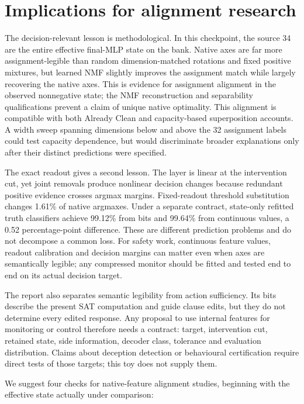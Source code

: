 \documentclass[
  british,
  11pt,
  a4paper,
]{article}
\begin{document}
\section{Implications for alignment
research}\label{implications-for-alignment-research}

The decision-relevant lesson is methodological. In this checkpoint, the
source 34 are the entire effective final-MLP state on the bank. Native
axes are far more assignment-legible than random dimension-matched
rotations and fixed positive mixtures, but learned NMF slightly improves
the assignment match while largely recovering the native axes. This is
evidence for assignment alignment in the observed nonnegative state; the
NMF reconstruction and separability qualifications prevent a claim of
unique native optimality. This alignment is compatible with both Already
Clean and capacity-based superposition accounts. A width sweep spanning
dimensions below and above the 32 assignment labels could test capacity
dependence, but would discriminate broader explanations only after their
distinct predictions were specified.

The exact readout gives a second lesson. The layer is linear at the
intervention cut, yet joint removals produce nonlinear decision changes
because redundant positive evidence crosses argmax margins.
Fixed-readout threshold substitution changes 1.61\% of native argmaxes.
Under a separate contract, state-only refitted truth classifiers achieve
99.12\% from bits and 99.64\% from continuous values, a 0.52
percentage-point difference. These are different prediction problems and
do not decompose a common loss. For safety work, continuous feature
values, readout calibration and decision margins can matter even when
axes are semantically legible; any compressed monitor should be fitted
and tested end to end on its actual decision target.

The report also separates semantic legibility from action sufficiency.
Its bits describe the present SAT computation and guide clause edits,
but they do not determine every edited response. Any proposal to use
internal features for monitoring or control therefore needs a contract:
target, intervention cut, retained state, side information, decoder
class, tolerance and evaluation distribution. Claims about deception
detection or behavioural certification require direct tests of those
targets; this toy does not supply them.

We suggest four checks for native-feature alignment studies, beginning
with the effective state actually under comparison:
\end{document}
